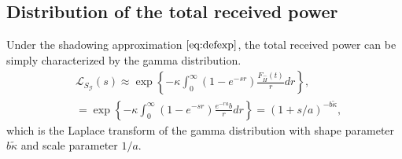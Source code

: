 \documentclass[conference]{IEEEtran}
\theoremstyle{definition}
\theoremstyle{plain}
\begin{document}
            \subsection{Distribution of the total received power}
             Under the shadowing approximation $\eqref{eq:defexp}$, the total received power can be simply characterized by the gamma distribution.
          \begin{align}
            \label{eq:lapexp}
            &\mathcal{L}_{S_{\mathcal{G}}}(s) \approx \exp\left\{-\mathcal{\kappa}\int_0^{\infty}(1-e^{-sr})\frac{F_{\hat{H}}(t)}{r} dr \right\}, \\
            &= \exp\left\{-\mathcal{\kappa}\int_0^{\infty}(1-e^{-sr})\frac{e^{-ra}b}{r} dr \right\}=(1+s/a)^{-b\tilde{\kappa}},
          \end{align}
          which is the Laplace transform of the gamma distribution with shape parameter $b\tilde{\kappa}$ and scale parameter $1/a$.
\end{document}
